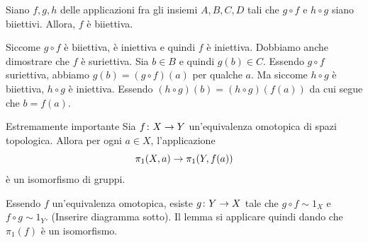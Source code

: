 \documentclass[a4paper]{article}
\begin{document}
\begin{snippetlemma}{}
    Siano \(f,g,h\) delle applicazioni fra gli insiemi \(A, B, C, D\)
    tali che \(g \circ f\) e \(h \circ g\) siano biiettivi.
    Allora, \(f\) è biiettiva.
\end{snippetlemma}

\begin{snippetproof}{}
    Siccome \(g \circ f\) è biiettiva, è iniettiva e quindi \(f\) è iniettiva.
    Dobbiamo anche dimostrare che \(f\) è suriettiva.
    Sia \(b \in B\) e quindi \(g(b) \in C\).
    Essendo \(g \circ f\) suriettiva, abbiamo \(g(b) = (g \circ f)(a)\)
    per qualche \(a\). Ma siccome \(h \circ g\)
    è biiettiva, \(h \circ g\) è iniettiva.
    Essendo \((h \circ g)(b) = (h \circ g)(f(a))\)
    da cui segue che \(b = f(a)\).
\end{snippetproof}

\begin{snippettheorem}{Estremamente importante}
    Sia \(f \colon X \to Y\) un'equivalenza omotopica di spazi topologica.
    Allora per ogni \(a \in X\), l'applicazione
    \[
        \pi_1(X,a) \to \pi_1(Y, f(a))
    \]
    è un isomorfismo di gruppi.
\end{snippettheorem}

\begin{snippetproof}{}
    Essendo \(f\) un'equivalenza omotopica, esiste \(g \colon Y\to X\)
    tale che \(g \circ f \sim 1_X\) e \(f\circ g \sim 1_Y\).
    (Inserire diagramma sotto).
    Il lemma si applicare quindi dando che \(\pi_1(f)\)
    è un isomorfismo.
\end{snippetproof}

\begin{center}
\end{center}
\end{document}
